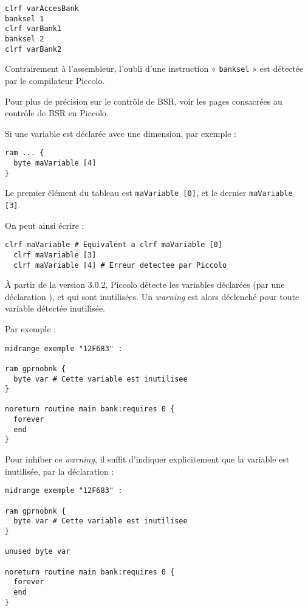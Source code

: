 \begin{lstlisting}[language=piccolo]
clrf varAccesBank
banksel 1
clrf varBank1
banksel 2
clrf varBank2
\end{lstlisting}

Contrairement à l'assembleur, l'oubli d'une instruction « \texttt{banksel} » est détectée par le compilateur Piccolo.

Pour plus de précision sur le contrôle de BSR, voir les pages consacrées au contrôle de BSR en Piccolo.

Si une variable est déclarée avec une dimension, par exemple :
\begin{lstlisting}[language=piccolo]
ram ... { 
  byte maVariable [4]
}
\end{lstlisting}

Le premier élément du tableau est \texttt{maVariable [0]}, et le dernier  \texttt{maVariable [3]}.

On peut ainsi écrire :
\begin{lstlisting}[language=piccolo]
  clrf maVariable # Equivalent a clrf maVariable [0]
  clrf maVariable [3]
  clrf maVariable [4] # Erreur detectee par Piccolo
\end{lstlisting}












À partir de la version 3.0.2, Piccolo détecte les variables déclarées (par une déclaration ), et qui sont inutilisées. Un \emph{warning} est alors déclenché pour toute variable détectée inutilisée.

Par exemple :

\begin{lstlisting}[language=piccolo]
midrange exemple "12F683" :

ram gprnobnk {
  byte var # Cette variable est inutilisee
}

noreturn routine main bank:requires 0 {
  forever
  end
}
\end{lstlisting}


Pour inhiber ce \emph{warning}, il suffit d'indiquer explicitement que la variable  est inutilisée, par la déclaration  :

\begin{lstlisting}[language=piccolo]
midrange exemple "12F683" :

ram gprnobnk {
  byte var # Cette variable est inutilisee
}

unused byte var

noreturn routine main bank:requires 0 {
  forever
  end
}
\end{lstlisting}

